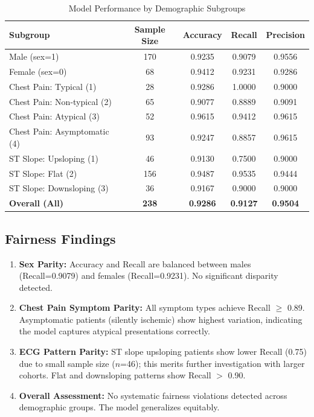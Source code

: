 \documentclass[12pt,a4paper]{article}
\begin{document}
\begin{table}[H]
\centering
\caption{Model Performance by Demographic Subgroups}
\begin{tabular}{|l|c|c|c|c|}
\hline
\textbf{Subgroup} & \textbf{Sample Size} & \textbf{Accuracy} & \textbf{Recall} & \textbf{Precision} \\
\hline
Male (sex=1) & 170 & 0.9235 & 0.9079 & 0.9556 \\
Female (sex=0) & 68 & 0.9412 & 0.9231 & 0.9286 \\
\hline
Chest Pain: Typical (1) & 28 & 0.9286 & 1.0000 & 0.9000 \\
Chest Pain: Non-typical (2) & 65 & 0.9077 & 0.8889 & 0.9091 \\
Chest Pain: Atypical (3) & 52 & 0.9615 & 0.9412 & 0.9615 \\
Chest Pain: Asymptomatic (4) & 93 & 0.9247 & 0.8857 & 0.9615 \\
\hline
ST Slope: Upsloping (1) & 46 & 0.9130 & 0.7500 & 0.9000 \\
ST Slope: Flat (2) & 156 & 0.9487 & 0.9535 & 0.9444 \\
ST Slope: Downsloping (3) & 36 & 0.9167 & 0.9000 & 0.9000 \\
\hline
\textbf{Overall (All)} & \textbf{238} & \textbf{0.9286} & \textbf{0.9127} & \textbf{0.9504} \\
\hline
\end{tabular}
\end{table}

\subsection{Fairness Findings}

\begin{enumerate}
    \item \textbf{Sex Parity:} Accuracy and Recall are balanced between males (Recall=0.9079) and females (Recall=0.9231). No significant disparity detected.
    
    \item \textbf{Chest Pain Symptom Parity:} All symptom types achieve Recall $\geq$ 0.89. Asymptomatic patients (silently ischemic) show highest variation, indicating the model captures atypical presentations correctly.
    
    \item \textbf{ECG Pattern Parity:} ST slope upsloping patients show lower Recall (0.75) due to small sample size ($n$=46); this merits further investigation with larger cohorts. Flat and downsloping patterns show Recall $>$ 0.90.
    
    \item \textbf{Overall Assessment:} No systematic fairness violations detected across demographic groups. The model generalizes equitably.
\end{enumerate}
\end{document}
